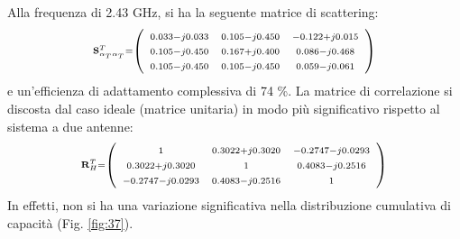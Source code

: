 \documentclass[technote]{IEEEtran}
\begin{document}
Alla frequenza di 2.43 GHz, si ha la seguente matrice di scattering:
\[\scriptstyle {{\bf{S}}_{{\alpha _T}{\alpha _T}}^T = \left( {\begin{array}{*{20}{c}}
\scriptstyle{0.033 - j0.033}&\scriptstyle{0.105 - j0.450}&\scriptstyle{ - 0.122 + j0.015}\\
\scriptstyle{0.105 - j0.450}&\scriptstyle{0.167 + j0.400}&\scriptstyle{0.086 - j0.468}\\
\scriptstyle{0.105 - j0.450}&\scriptstyle{0.105 - j0.450}&\scriptstyle{0.059 - j0.061}
\end{array}} \right) }\]
e un'efficienza di adattamento complessiva di 74 \%. La matrice di correlazione si discosta dal caso ideale (matrice unitaria) in modo più significativo rispetto al sistema a due antenne:
\[\scriptstyle{ {\bf{R}}_H^T = \left( {\begin{array}{*{20}{c}}
\scriptstyle 1&\scriptstyle{0.3022 + j0.3020}&\scriptstyle{ - 0.2747 - j0.0293}\\
\scriptstyle{0.3022 + j0.3020}&\scriptstyle 1&\scriptstyle{0.4083 - j0.2516}\\
\scriptstyle{ - 0.2747 - j0.0293}&\scriptstyle{0.4083 - j0.2516}&\scriptstyle 1
\end{array}} \right) }\] In effetti, non si ha una variazione significativa nella distribuzione cumulativa di capacità (Fig. \ref{fig:37}).
\end{document}
